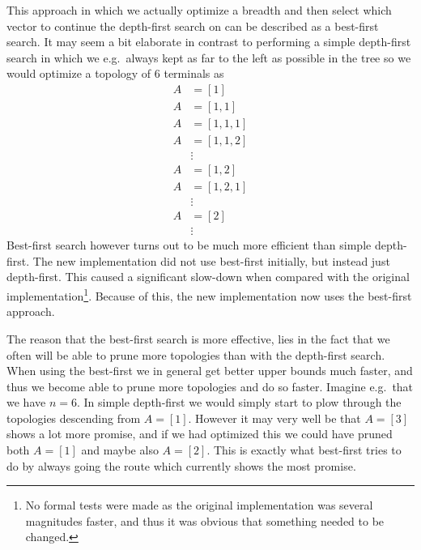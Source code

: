 This approach in which we actually optimize a breadth and then select which
vector to continue the depth-first search on can be described as a best-first
search. It may seem a bit elaborate in contrast to performing a simple
depth-first search in which we e.g.\ always kept as far to the left as possible
in the tree so we would optimize a topology of $6$ terminals as
%
\begin{align}
  A & = [1]     \\
  A & = [1,1]   \\
  A & = [1,1,1] \\
  A & = [1,1,2] \\
    & \vdots    \\
  A & = [1,2]   \\
  A & = [1,2,1] \\
    & \vdots    \\
  A & = [2]     \\
    & \vdots
\end{align}
%
Best-first search however turns out to be much more efficient than simple
depth-first. The new implementation did not use best-first initially, but
instead just depth-first. This caused a significant slow-down when compared with
the original implementation\footnote{No formal tests were made as the original
  implementation was several magnitudes faster, and thus it was obvious that
  something needed to be changed.}. Because of this, the new implementation now
uses the best-first approach.

The reason that the best-first search is more effective, lies in the fact that
we often will be able to prune more topologies than with the depth-first
search. When using the best-first we in general get better upper bounds much
faster, and thus we become able to prune more topologies and do so
faster. Imagine e.g.\ that we have $n = 6$. In simple depth-first we would
simply start to plow through the topologies descending from $A = [1]$. However
it may very well be that $A = [3]$ shows a lot more promise, and if we had
optimized this we could have pruned both $A = [1]$ and maybe also $A = [2]$.
This is exactly what best-first tries to do by always going the route which
currently shows the most promise.

